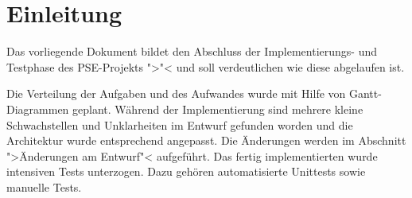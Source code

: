 \chapter{Einleitung}
Das vorliegende Dokument bildet den Abschluss der Implementierungs- und Testphase des PSE-Projekts ">\projektTitel"< und soll verdeutlichen wie diese abgelaufen ist.

Die Verteilung der Aufgaben und des Aufwandes wurde mit Hilfe von Gantt-Diagrammen geplant.
Während der Implementierung sind mehrere kleine Schwachstellen und Unklarheiten im Entwurf gefunden worden und die Architektur wurde entsprechend angepasst. Die Änderungen werden im Abschnitt ">Änderungen am Entwurf"< aufgeführt.
Das fertig implementierten \projektTitel wurde intensiven Tests unterzogen. Dazu gehören automatisierte Unittests sowie manuelle Tests.